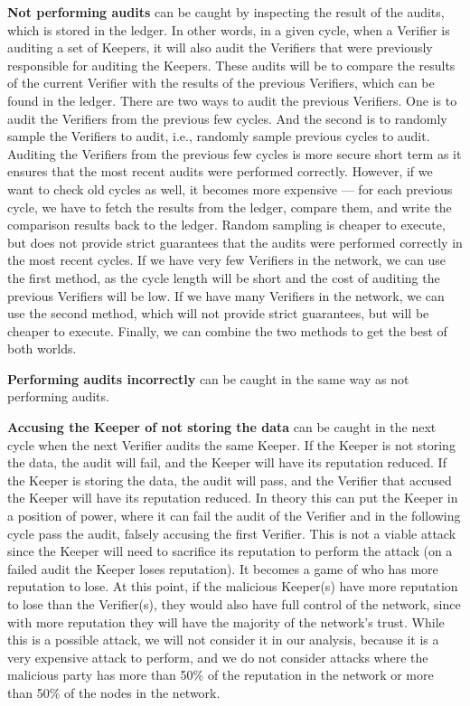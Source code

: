 \textbf{Not performing audits} can be caught by inspecting the result of the audits,
which is stored in the ledger.
In other words, in a given cycle, when a Verifier is auditing a set of Keepers,
it will also audit the Verifiers that were previously responsible for auditing the Keepers.
These audits will be to compare the results of the current Verifier
with the results of the previous Verifiers,
which can be found in the ledger.
There are two ways to audit the previous Verifiers.
One is to audit the Verifiers from the previous few cycles.
And the second is to randomly sample the Verifiers to audit,
i.e., randomly sample previous cycles to audit.
Auditing the Verifiers from the previous few cycles is more secure short term
as it ensures that the most recent audits were performed correctly.
However, if we want to check old cycles as well, it becomes more expensive ---
for each previous cycle, we have to fetch the results from the ledger, compare them,
and write the comparison results back to the ledger.
Random sampling is cheaper to execute, but does not provide strict guarantees
that the audits were performed correctly in the most recent cycles.
If we have very few Verifiers in the network, we can use the first method,
as the cycle length will be short and the cost of auditing the previous Verifiers will be low.
If we have many Verifiers in the network, we can use the second method,
which will not provide strict guarantees, but will be cheaper to execute.
Finally, we can combine the two methods to get the best of both worlds.

\textbf{Performing audits incorrectly} can be caught in the same way as not performing audits.

\textbf{Accusing the Keeper of not storing the data} can be caught in the next cycle
when the next Verifier audits the same Keeper.
If the Keeper is not storing the data, the audit will fail, and the Keeper will have its reputation reduced.
If the Keeper is storing the data, the audit will pass, and the Verifier that accused the Keeper
will have its reputation reduced.
In theory this can put the Keeper in a position of power, where it can fail the audit of the Verifier
and in the following cycle pass the audit, falsely accusing the first Verifier.
This is not a viable attack since the Keeper will need to sacrifice its reputation to perform the attack
(on a failed audit the Keeper loses reputation).
It becomes a game of who has more reputation to lose.
At this point, if the malicious Keeper(s) have more reputation to lose than the Verifier(s),
they would also have full control of the network,
since with more reputation they will have the majority of the network's trust.
While this is a possible attack, we will not consider it in our analysis,
because it is a very expensive attack to perform, and we do not consider
attacks where the malicious party has more than 50\% of the reputation in the network
or more than 50\% of the nodes in the network.

